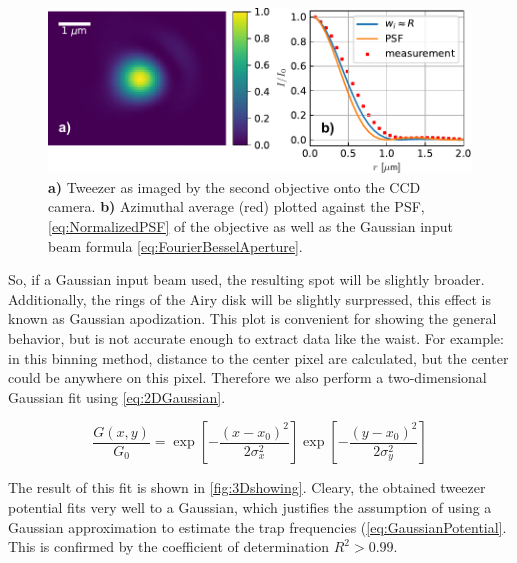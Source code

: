 \begin{figure}
    \centering
    \includegraphics[width=\linewidth]{figures/AzimuthalAverageSpotZoomed.pdf}
    \caption{\textbf{a)} Tweezer as imaged by the second objective onto the CCD camera. 
	\textbf{ b)} Azimuthal average (red) plotted against the \ac{PSF}, \cref{eq:NormalizedPSF} of the objective as well as the Gaussian input beam formula \cref{eq:FourierBesselAperture}.}
    \label{fig:2Dresults}
\end{figure}


So, if a Gaussian input beam used, the resulting spot will be slightly broader.
Additionally, the rings of the Airy disk will be slightly surpressed, this effect is known as Gaussian apodization.
This plot is convenient for showing the general behavior, but is not accurate enough to extract data like the waist. 
For example: in this binning method, distance to the center pixel are calculated, but the center could be anywhere on this pixel. 
Therefore we also perform a two-dimensional Gaussian fit using \cref{eq:2DGaussian}.

\begin{equation}\label{eq:2DGaussian}
    \frac{G(x,y)}{G_0} =  
    \exp{\left[ -\frac{(x-x_0)^2}{2\sigma_x^2}\right]}
    \exp{\left[ -\frac{(y-x_0)^2}{2\sigma_y^2}\right]}
\end{equation}

The result of this fit is shown in \cref{fig:3Dshowing}. 
Cleary, the obtained tweezer potential fits very well to a Gaussian, which justifies the assumption of using a Gaussian approximation to estimate the trap frequencies (\cref{eq:GaussianPotential}. 
This is confirmed by the coefficient of determination $R^2 > 0.99$.

